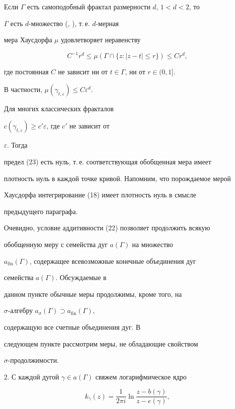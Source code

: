 Если $\Gamma$ есть самоподобный фрактал размерности $d$, $1<d<2$, то 


$\Gamma$ есть $d$-множество (\cite{10}, \cite{22}), т.\,е. $d$-мерная 


мера Хаусдорфа $\mu$ удовлетворяет неравенству 


$$ 


C^{-1}r^d\le\mu(\Gamma\cap\{z:|z-t|\le r\})\le C r^d, 


$$ 


где постоянная $C$ не зависит ни от $t\in \Gamma$, ни от $r\in(0,1]$. 


В частности, $\mu(\gamma_{t,\varepsilon})\le C\varepsilon^d$. 


Для многих классических фракталов 


$c(\gamma_{t,\varepsilon})\ge c'\varepsilon$, где $c'$ не зависит от 


$\varepsilon$. Тогда 


предел (23) есть нуль, т.\,е. соответствующая обобщенная мера имеет 


плотность нуль в каждой точке кривой. Напомним, что порождаемое мерой 


Хаусдорфа интегрирование (18) имеет плотность нуль в смысле 


предыдущего параграфа. 


 


Очевидно, условие аддитивности (22) позволяет продолжить всякую 


обобщенную меру с семейства дуг $a(\Gamma)$ на множество 


$a_{\text{fin}}(\Gamma)$, содержащее всевозможные конечные объединения дуг 


семейства $a(\Gamma)$. Обсуждаемые в 


данном пункте обычные меры продолжимы, кроме того, на 


$\sigma$-алгебру $a_\sigma(\Gamma)\supset a_{\text{fin}}(\Gamma)$, 


содержащую все счетные объединения дуг. В 


следующем пункте рассмотрим меры, не обладающие свойством 


$\sigma$-продолжимости. 


\medskip 


 


2. С каждой дугой $\gamma\in a(\Gamma)$ свяжем логарифмическое ядро 


\begin{equation} 


k_\gamma(z)=\frac{1}{2\pi i}\ln\frac{z-b(\gamma)}{z-e(\gamma)}, 


\end{equation} 


